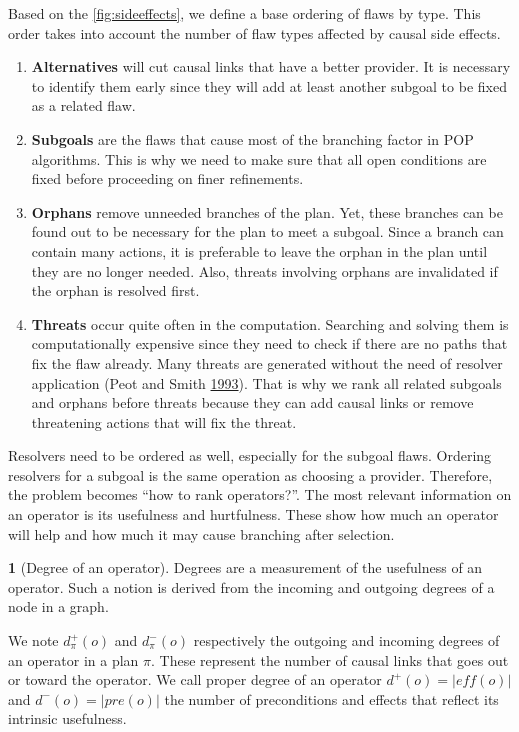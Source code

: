 \documentclass[11pt,a4paper,twoside,openright,titlepage,numbers=noenddot,headinclude,cleardoublepage=empty,openany]{scrreprt}
\theoremstyle{plain}
\theoremstyle{definition}
\newtheorem{definition}{\capitalisewords{definition}}[]
\theoremstyle{remark}
\providecommand{\tightlist}{%
  \setlength{\itemsep}{0pt}\setlength{\parskip}{0pt}}
\begin{document}
Based on the \cref{fig:sideeffects}, we define a base ordering of flaws
by type. This order takes into account the number of flaw types affected
by causal side effects.

\begin{enumerate}
\def\labelenumi{\arabic{enumi}.}
\tightlist
\item
  \textbf{Alternatives} will cut causal links that have a better
  provider. It is necessary to identify them early since they will add
  at least another subgoal to be fixed as a related flaw.
\item
  \textbf{Subgoals} are the flaws that cause most of the branching
  factor in POP algorithms. This is why we need to make sure that all
  open conditions are fixed before proceeding on finer refinements.
\item
  \textbf{Orphans} remove unneeded branches of the plan. Yet, these
  branches can be found out to be necessary for the plan to meet a
  subgoal. Since a branch can contain many actions, it is preferable to
  leave the orphan in the plan until they are no longer needed. Also,
  threats involving orphans are invalidated if the orphan is resolved
  first.
\item
  \textbf{Threats} occur quite often in the computation. Searching and
  solving them is computationally expensive since they need to check if
  there are no paths that fix the flaw already. Many threats are
  generated without the need of resolver application (Peot and Smith
  \protect\hyperlink{ref-peot_threatremoval_1993}{1993}). That is why we
  rank all related subgoals and orphans before threats because they can
  add causal links or remove threatening actions that will fix the
  threat.
\end{enumerate}

Resolvers need to be ordered as well, especially for the subgoal flaws.
Ordering resolvers for a subgoal is the same operation as choosing a
provider. Therefore, the problem becomes ``how to rank operators?''. The
most relevant information on an operator is its usefulness and
hurtfulness. These show how much an operator will help and how much it
may cause branching after selection.

\begin{definition}[Degree of an operator]

Degrees are a measurement of the usefulness of an operator. Such a
notion is derived from the incoming and outgoing degrees of a node in a
graph.

We note \(d_\pi^+(o)\) and \(d_\pi^-(o)\) respectively the outgoing and
incoming degrees of an operator in a plan \(\pi\). These represent the
number of causal links that goes out or toward the operator. We call
proper degree of an operator \(d^+(o) = |eff(o)|\) and
\(d^-(o) = |pre(o)|\) the number of preconditions and effects that
reflect its intrinsic usefulness.

\end{definition}
\end{document}
